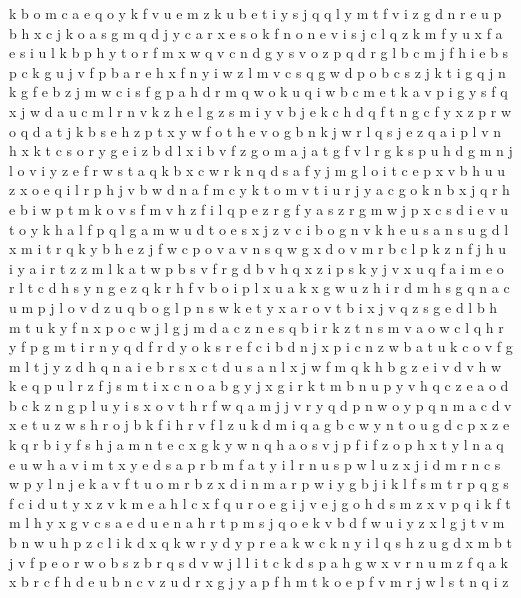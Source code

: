 \documentclass{article}
\begin{document}
k b o m c a e
q o y k f v u
e m
z k u b e t i y s j q
q l y m t f v i z g d n r e u p b h x c j k o a s
g m q d j y c a r x e s o k f n
o n e v i s j c l q z k m f y
u x f a e
s i u l k b p h y t o r f m x w q v c n d g
y s v o z p q d r g l b c m j f h i e
b s p c k g u j v
f p
b a r e h x f n y i w z l m v c s q g
w d p o b c s z j k t i g q
j n k g f
e b z j m w
c i s f g p a h d r m q w o k
u q i w b c m e t k a v p
i g y s f q x j w d a u c m l r n v k z
h e
l g z s m i y
v b j e k c h d q f t
n g c f y x z p r w o q d a t j k b s e h
z p t x y w f o
t h e v o g b n k j w r l q s
j e z q a i p l v n h x k t c s o r y g
e i z b d l
x i
b v f z g o m
a j
a t g f v
l r g k s
p u h d g m n j l o v i y z e f r w s t a q k b x c
w r k n q d s a f y j m g l o i t c e p x v b h u
u z x o e q i l r p h j v b w d n a f m c y k t
o
m v t i u r j y a c g o k n b
x j q r h e b i w p t m k o v s f
m v h z f i l q
p e z r g f y a s
z r g m w j p x c s d i e v u t o y k h a l f
p q l g a m w u d t o e s x j z v c i b
o g n v k h e u s
a n s u g d l x m i t r q k y b h e z j f w c p o v
a v n
s q w g x d o v m r b c l p k z n f j h u i y a
i r t z
z m l k a t w p b s v f
r
g d b v h q x z i
p s k y j v x u q f a i m e o r l t c d h
s y n g e z q k r h f v b o i p l x u a
k x g w u z h i r d m
h s g q n a c u m p j l o v d
z u q b o g l p n s w k e t y x
a r o v t b i x j
v q z s g e d l b h m t u k y f n x p o c w j
l g j m d a c z n e s q b i r
k z t n s m v a o w c l q h r y f p g
m t i r n y q
d f
r d y
o k s r e f c i b d n j
x p i c n z w b a t
u k c o v f g m l t j y z d h q n a i e b r s x
c t d u s a n l x j w f m q k h b g z e i v
d v h w k e q p u l r z f j s m t i x c n o a b g y
j x g i r k t m b n u p y v h q c z e a
o
d b c k z n g p l u y i s x o v t h r f w q a m j
j v r y q d p n w o
y p q n m a c d v x e t u z w s h r o j b k f i
h r v f l z u k d m i q a g b c w y n
t o u g d c p x z e k q r b i y f s h j a m n
t e c x g k y w n q h a o s v j p f
i f z o p h x t y l n a q e u w
h a v
i m t x y e d s a p r b
m f a t y i l r n u s
p w l u z x j i d m r n c
s w p y l n j e k a v f t u o m r b z x d i
n m a r p w i y g b j
i k l f s m t
r p q g s f c i d u t y x z v k m e a h l
c x
f q u r o e g i j v
e j g o h d s m z x v p
q i k f t m l h y x g v c s a e
d u e
n a h r t p m s j q o e k v b d f w u i y z x l g
j t v m b n w u h p z c l i k d x q
k w r y
d y p r e a k w
c k n y i l q s h z u g d x m b t j v f p e o r w
o b s
z b r q s d v w j l
l i t c k d s p a h g w x v r n u m z f q
a k x b r c f h d e u
b n c v z u d r x g j y a p f h m t k o
e p f v m r j w l s t n q i z
\end{document}
